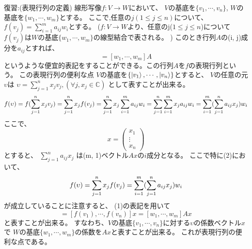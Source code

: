 {\large 復習:(表現行列の定義)}
\setcounter{equation}{0}
線形写像$f:V \to W$において、
$V$の基底を$\{v_1, \cdots, v_n\}$, $W$の基底を$\{w_1,\cdots, w_m\}$とする。
\newline
ここで,任意の$j (1\leq j\leq n)$について、
$f(v_j) = \sum_{i=1}^m a_{ij}w_i$とする。
\newline
($f:V \to W$より、任意のj($1\leq j\leq n$)について
$f(v_j)$は$W$の基底$\{w_1, \cdots, w_m\}$の線型結合で表される。
)
\newline
このとき行列$A$の(i, j)成分を$a_{ij}$とすれば、 
\begin{equation}
[f(v_1), \cdots, f(v_n)] = [w_1, \cdots, w_m]A
\end{equation}
というような便宜的表記をすることができる。この行列$A$を$f$の表現行列という。
\newline
 この表現行列の便利な点
\newline
$V$の基底を$\{\ket{v_1},\cdots, \ket{v_n}\}$とすると、 
$V$の任意の元$\upsilon$は
$\upsilon = \sum_{j=1}^n x_j v_j, (\forall j, x_j \in \mathbb{C})$
として表すことが出来る。
\newline
\begin{equation}
f(\upsilon) \newline
=f(\sum_{j=1}^n x_j v_j) \\ 
=\sum_{j=1}^n x_j f(v_j) \\
=\sum_{j=1}^n x_j \sum_{i=1}^m a_{ij}w_i \\
=\sum_{j=1}^n \sum_{i=1}^m x_j a_{ij}w_i \\
=\sum_{i=1}^m (\sum_{j=1}^n a_{ij} x_j)w_i
\end{equation}
ここで、
\[x = \left(
	\begin{array}{c}
	x_1 \\
	\vdots \\
	x_n
	\end{array}
	\right)
\]
とすると、
$\sum_{j=1}^n a_{ij} x_j$
は(m, 1)ベクトル$Ax$の$i$成分となる。
\newline
ここで特に(2)において、
\begin{equation}
f(\upsilon)
=\sum_{j=1}^n x_j f(v_j) \\
=\sum_{i=1}^m (\sum_{j=1}^n a_{ij} x_j)w_i
\end{equation}
が成立していることに注意すると、
(1)の表記を用いて
\begin{equation}
[f(\upsilon)]=[f(v_1), \cdots, f(v_n)]x
 = [w_1, \cdots, w_m]Ax
\end{equation}
と表すことが出来る。
すなわち、$V$の基底$\{v_1,\cdots, v_n\}$に対する$\upsilon$の係数ベクトル$x$
で $W$の基底$\{w_1,\cdots, w_m\}$の係数を$Ax$と表すことが出来る。
これが表現行列の便利な点である。
